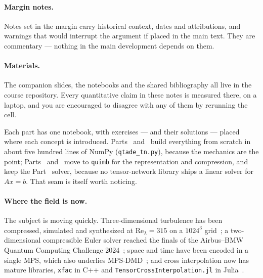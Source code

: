 \documentclass[english,course]{lecturenotes}
\begin{document}
\paragraph{Margin notes.}
Notes set in the margin carry historical context, dates and attributions, and
warnings that would interrupt the argument if placed in the main text. They are
commentary --- nothing in the main development depends on them.

\paragraph{Materials.}
The companion slides, the notebooks and the shared bibliography all live in the
course repository. Every quantitative claim in these notes is measured there,
on a laptop, and you are encouraged to disagree with any of them by rerunning
the cell.

Each part has one notebook, with exercises --- and their solutions --- placed
where each concept is introduced. Parts~ and~ build everything from scratch in
about five hundred lines of NumPy (\texttt{qtade\_tn.py}), because the mechanics
are the point; Parts~ and~ move to \texttt{quimb} for the
representation and compression, and keep the Part~ solver, because no
tensor-network library ships a linear solver for $Ax=b$. That seam is itself
worth noticing.

\paragraph{Where the field is now.}
The subject is moving quickly. Three-dimensional turbulence has been
compressed, simulated and synthesized at $\mathrm{Re}_\lambda = 315$ on a
$1024^3$ grid~\cite{Pisoni2026}; a two-dimensional compressible Euler solver
reached the finals of the Airbus--BMW Quantum Computing Challenge
2024~\cite{Peddinti2025}; space and time have been encoded in a single MPS,
which also underlies MPS-DMD~\cite{Peddinti2025a}; and cross interpolation now
has mature libraries, \texttt{xfac} in C++ and
\texttt{Tensor\-Cross\-Inter\-polation.jl} in Julia~\cite{Nunez2025}.








\printbibliography[heading=bibintoc] %
\end{document}
